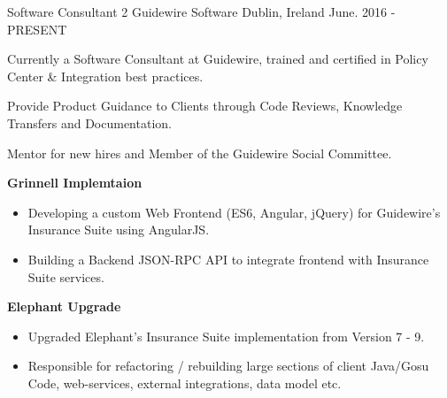 \begin{cventries}
   \cventry
    {Software Consultant 2} %
    {Guidewire Software} %
    {Dublin, Ireland} %
    {June. 2016 - PRESENT} %
    {
    \begin{cvitems} %
     	\item {Currently a Software Consultant at Guidewire, trained and certified in Policy Center \& Integration best practices.}
     	\item {Provide Product Guidance to Clients through Code Reviews, Knowledge Transfers and Documentation.}
     	\item {Mentor for new hires and Member of the Guidewire Social Committee.{~\vskip 0.05in}}
         {\textbf{Grinnell Implemtaion}\hfill{}
         \begin{itemize}
          \item {Developing a custom Web Frontend (ES6, Angular, jQuery) for Guidewire's Insurance Suite using AngularJS.}
          \item {Building a Backend JSON-RPC API to integrate frontend with Insurance Suite services.}{~\vskip 0.05in}
        \end{itemize}}
       {\textbf{Elephant Upgrade}\hfill{}
         \begin{itemize}
		       \item {Upgraded Elephant's Insurance Suite implementation from Version 7 - 9.}
		       \item {Responsible for refactoring / rebuilding large sections of client Java/Gosu Code, web-services, external integrations, data model etc.}

\end{itemize}}
\end{cvitems}}
\end{cventries}

